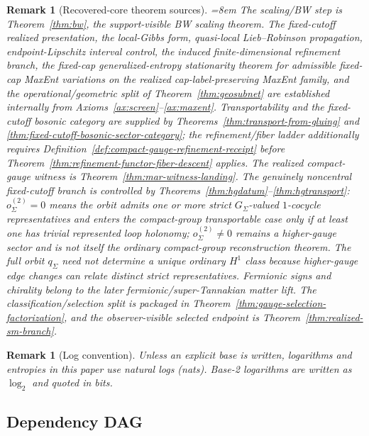 \documentclass[11pt]{article}
\newtheorem{remark}[theorem]{Remark}
\begin{document}
\begin{remark}[Recovered-core theorem sources]\label{ass:technical}\emergencystretch=8em\relax
The scaling/BW step is Theorem~\ref{thm:bw}, the support-visible BW scaling theorem. The fixed-cutoff realized presentation, the local-Gibbs form, quasi-local Lieb--Robinson propagation, endpoint-Lipschitz interval control, the induced finite-dimensional refinement branch, the fixed-cap generalized-entropy stationarity theorem for admissible fixed-cap MaxEnt variations on the realized cap-label-preserving MaxEnt family, and the operational/geometric split of Theorem~\ref{thm:geosubnet} are established internally from Axioms~\ref{ax:screen}--\ref{ax:maxent}. Transportability and the fixed-cutoff bosonic category are supplied by Theorems~\ref{thm:transport-from-gluing} and \ref{thm:fixed-cutoff-bosonic-sector-category}; the refinement/fiber ladder additionally requires Definition~\ref{def:compact-gauge-refinement-receipt} before Theorem~\ref{thm:refinement-functor-fiber-descent} applies. The realized compact-gauge witness is Theorem~\ref{thm:mar-witness-landing}. The genuinely noncentral fixed-cutoff branch is controlled by Theorems~\ref{thm:hgdatum}--\ref{thm:hgtransport}: \(o^{(2)}_\Sigma=0\) means the orbit admits one or more strict \(G_\Sigma\)-valued \(1\)-cocycle representatives and enters the compact-group transportable case only if at least one has trivial represented loop holonomy; \(o^{(2)}_\Sigma\ne0\) remains a higher-gauge sector and is not itself the ordinary compact-group reconstruction theorem. The full orbit \(q_\Sigma\) need not determine a unique ordinary \(H^1\) class because higher-gauge edge changes can relate distinct strict representatives. Fermionic signs and chirality belong to the later fermionic/super-Tannakian matter lift.
The classification/selection split is packaged in Theorem~\ref{thm:gauge-selection-factorization},
and the observer-visible selected endpoint is Theorem~\ref{thm:realized-sm-branch}.
\end{remark}

\begin{remark}[Log convention]
Unless an explicit base is written, logarithms and entropies in this paper use natural logs (nats). Base-2 logarithms are written as \(\log_2\) and quoted in bits.
\end{remark}

\subsection*{Dependency DAG}
\end{document}
